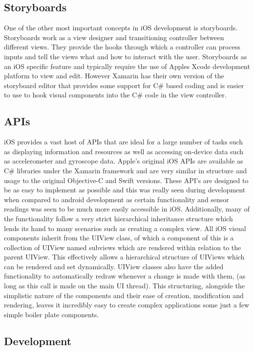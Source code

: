 \documentclass[main.tex]{subfiles}
\begin{document}
\subsection{Storyboards}
One of the other most important concepts in iOS development is storyboards. Storyboards work as a view designer and transitioning controller between different views. They provide the hooks through which a controller can process inputs and tell the views what and how to interact with the user. Storyboards as an iOS specific feature and typically require the use of Apples Xcode development platform to view and edit. However Xamarin has their own version of the storyboard editor that provides some support for C# based coding and is easier to use to hook visual components into the C# code in the view controller.

\subsection{APIs}
iOS provides a vast host of APIs that are ideal for a large number of tasks such as displaying information and resources as well as accessing on-device data such as accelerometer and gyroscope data. Apple’s original iOS APIs are available as C# libraries under the Xamarin framework and are very similar in structure and usage to the original Objective-C and Swift versions. These API’s are designed to be as easy to implement as possible and this was really seen during development when compared to android development as certain functionality and sensor readings was seen to be much more easily accessible in iOS. Additionally, many of the functionality follow a very strict hierarchical inheritance structure which lends its hand to many scenarios such as creating a complex view. All iOS visual components inherit from the UIView class, of which a component of this is a collection of UIView named subviews which are rendered within relation to the parent UIView. This effectively allows a hierarchical structure of UIViews which can be rendered and set dynamically. UIView classes also have the added functionality to automatically redraw whenever a change is made with them, (as long as this call is made on the main UI thread). This structuring, alongside the simplistic nature of the components and their ease of creation, modification and rendering, leaves it incredibly easy to create complex applications some just a few simple boiler plate components.

\subsection{Development}
\end{document}
